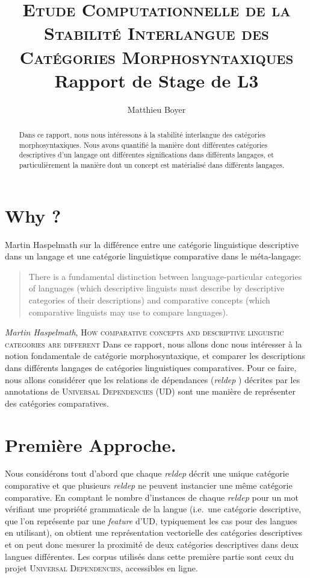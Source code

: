 \documentclass{cours}
\title{\textsc{Etude Computationnelle de la Stabilité Interlangue des Catégories Morphosyntaxiques}\\
{\small Rapport de Stage de L3} }
\author{Matthieu Boyer}
\begin{document}
    \begin{abstract}
        Dans ce rapport, nous nous intéressons à la stabilité interlangue des catégories morphosyntaxiques.
        Nous avons quantifié la manière dont différentes catégories descriptives d'un langage ont différentes
        significations dans différents langages,
        et particulièrement la manière dont un concept est matérialisé dans différents langages.
    \end{abstract}


    \section{Why ?}\label{sec:why-?}
    Martin Haspelmath sur la différence entre une catégorie linguistique descriptive dans un langage et une catégorie
    linguistique comparative dans le méta-langage:
    \begin{quote}
        There is a fundamental distinction between language-particular categories of languages (which descriptive
        linguists must describe by descriptive categories of their descriptions) and comparative concepts (which
        comparative linguists may use to compare languages).
    \end{quote}
    {\flushright
    {\textit{Martin Haspelmath}, \textsc{How comparative concepts and descriptive linguistic categories are different}}}
    Dans ce rapport, nous allons donc nous intéresser à la notion fondamentale de catégorie morphosyntaxique, et
    comparer les descriptions dans différents langages de catégories linguistiques comparatives.
    Pour ce faire, nous allons considérer que les relations de dépendances (\textit{reldep}
    ) décrites par les annotations de \textsc{Universal Dependencies} (UD)
    sont une manière de représenter des catégories comparatives.


    \section{Première Approche.}\label{sec:premiere-approche.}
    Nous considérons tout d'abord que chaque \textit{reldep} décrit une unique catégorie comparative et que plusieurs
    \textit{reldep} ne peuvent instancier une même catégorie comparative.
    En comptant le nombre d'instances de chaque \textit{reldep}
    pour un mot vérifiant une propriété grammaticale de la langue (i.e.\
    une catégorie descriptive, que l'on représente par une \textit{feature}
    d'UD, typiquement les cas pour des langues en utilisant), on obtient une représentation vectorielle des catégories
    descriptives et on peut donc mesurer la proximité de deux catégories descriptives dans deux langues différentes.
    Les corpus utilisés dans cette première partie sont ceux du projet \textsc{Universal Dependencies}, accessibles en ligne.
\end{document}
